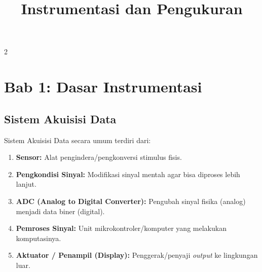 \documentclass[10pt]{article}
\title{Instrumentasi dan Pengukuran}
\author{}
\date{}
\begin{document}
\maketitle

\begin{multicols}{2}

\section*{Bab 1: Dasar Instrumentasi}
\label{bab1}

\subsection*{Sistem Akuisisi Data}
Sistem Akuisisi Data secara umum terdiri dari:
\begin{enumerate}
    \item \textbf{Sensor:} Alat pengindera/pengkonversi stimulus fisis.
    \item \textbf{Pengkondisi Sinyal:} Modifikasi sinyal mentah agar bisa diproses lebih lanjut.
    \item \textbf{ADC (Analog to Digital Converter):} Pengubah sinyal fisika (analog) menjadi data biner (digital).
    \item \textbf{Pemroses Sinyal:} Unit mikrokontroler/komputer yang melakukan komputasinya.
    \item \textbf{Aktuator / Penampil (Display):} Penggerak/penyaji \textit{output} ke lingkungan luar.
\end{enumerate}


\end{multicols}
\end{document}
